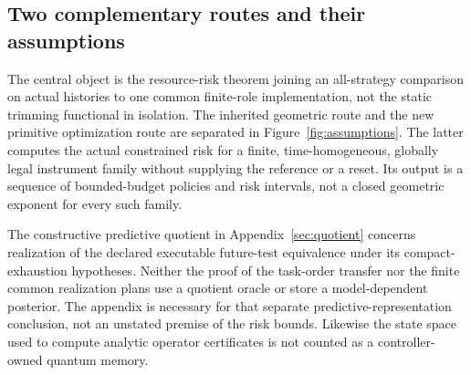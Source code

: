 \subsection*{Two complementary routes and their assumptions}
The central object is the resource-risk theorem joining an all-strategy comparison on actual histories to one common finite-role implementation, not the static trimming functional in isolation. The inherited geometric route and the new primitive optimization route are separated in Figure~\ref{fig:assumptions}. The latter computes the actual constrained risk for a finite, time-homogeneous, globally legal instrument family without supplying the reference or a reset. Its output is a sequence of bounded-budget policies and risk intervals, not a closed geometric exponent for every such family.

The constructive predictive quotient in Appendix~\ref{sec:quotient} concerns realization of the declared executable future-test equivalence under its compact-exhaustion hypotheses. Neither the proof of the task-order transfer nor the finite common realization plans use a quotient oracle or store a model-dependent posterior. The appendix is necessary for that separate predictive-representation conclusion, not an unstated premise of the risk bounds. Likewise the state space used to compute analytic operator certificates is not counted as a controller-owned quantum memory.

